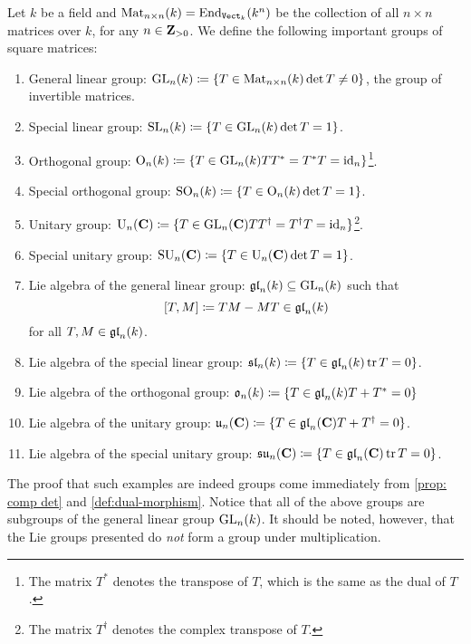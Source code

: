 \begin{example}
\label{exp:important-matrix-groups}
Let \(k\) be a field and \(\operatorname{Mat}_{n \times n}(k) = \operatorname{End}_{{\texttt{Vect}}_k}(k^n)\) be the
collection of all \(n \times n\) matrices over \(k\), for any \(n \in \mathbf{Z}_{>
0}\). We define the following important groups of square matrices:
\begin{enumerate}\setlength\itemsep{0em}
\item General linear group: \(\operatorname{GL}_n(k) \coloneq \{T \in \operatorname{Mat}_{n \times n}(k)
\relax \det T \neq 0\}\), the group of invertible matrices.

\item Special linear group: \(\operatorname{SL}_n(k) \coloneq \{T \in \operatorname{GL}_n(k) \relax \det T =
1\}\).

\item Orthogonal group: \(\operatorname{O}_n(k) \coloneq \{T \in \operatorname{GL}_n(k) \relax T T^{*} =
T^{*} T = \operatorname{id}_n\}\)\footnote{The matrix \(T^{*}\) denotes the transpose of
\(T\), which is the same as the dual of \(T\).}.

\item Special orthogonal group: \(\operatorname{SO}_n(k) \coloneq \{T \in \operatorname{O}_n(k) \relax
\det T = 1\}\).

\item Unitary group: \(\operatorname{U}_n(\mathbf{C}) \coloneq \{T \in \operatorname{GL}_n(\mathbf{C}) \relax T
T^{\dag} = T^{\dag} T = \operatorname{id}_n\}\)\footnote{The matrix \(T^{\dag}\) denotes the
  complex transpose of \(T\).}.

\item Special unitary group: \(\operatorname{SU}_n(\mathbf{C}) \coloneq \{T \in \operatorname{U}_n(\mathbf{C}) \relax
\det T = 1\}\).

\item Lie algebra of the general linear group: \(\mathfrak{gl}_n(k) \subseteq
\operatorname{GL}_n(k)\) such that
\[
[T, M] \coloneq T M - M T \in \mathfrak{gl}_n(k)
\]
for all \(T, M \in \mathfrak{gl}_n(k)\).

\item Lie algebra of the special linear group: \(\mathfrak{sl}_n(k) \coloneq \{T \in
\mathfrak{gl}_n(k) \relax \operatorname{tr} T = 0\}\).

\item Lie algebra of the orthogonal group: \(\mathfrak{o}_n(k) \coloneq \{ T \in
\mathfrak{gl}_n(k) \relax T + T^{*} = 0\}\)

\item Lie algebra of the unitary group: \(\mathfrak{u}_n(\mathbf{C}) \coloneq \{T \in
\mathfrak{gl}_n(\mathbf{C}) \relax T + T^{\dag} = 0\}\).

\item Lie algebra of the special unitary group: \(\mathfrak{su}_n(\mathbf{C}) \coloneq \{T
\in \mathfrak{gl}_n(\mathbf{C}) \relax \operatorname{tr} T = 0\}\).
\end{enumerate}
The proof that such examples are indeed groups come immediately from \cref{prop:
comp det} and \cref{def:dual-morphism}. Notice that all of the above groups are
subgroups of the general linear group \(\operatorname{GL}_n(k)\). It should be noted, however,
that the Lie groups presented do \emph{not} form a group under multiplication.
\end{example}

